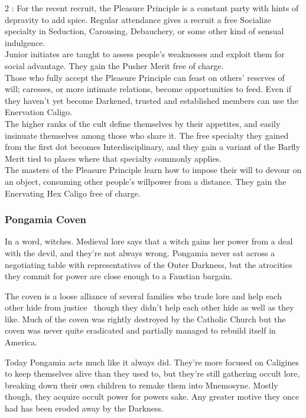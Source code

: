 \begin{multicols}{2}
\noindent \textbullet: For the recent recruit, the Pleasure Principle is a constant party with hints of depravity to add spice. Regular attendance gives a recruit a free Socialize specialty in Seduction, Carousing, Debauchery, or some other kind of sensual indulgence.\\
\noindent \textbullet\textbullet Junior initiates are taught to assess people’s weaknesses and exploit them for social advantage. They gain the Pusher Merit free of charge.\\
\noindent \textbullet\textbullet\textbullet Those who fully accept the Pleasure Principle can feast on others’ reserves of will; caresses, or more intimate relations, become opportunities to feed. Even if they haven’t yet become Darkened, trusted and established members can use the Enervation Caligo.\\
\noindent \textbullet\textbullet\textbullet\textbullet The higher ranks of the cult define themselves by their appetites, and easily insinuate themselves among those who share it. The free specialty they gained from the first dot becomes Interdisciplinary, and they gain a variant of the Barfly Merit tied to places where that specialty commonly applies.\\
\noindent \textbullet\textbullet\textbullet\textbullet\textbullet The masters of the Pleasure Principle learn how to impose their will to devour on an object, consuming other people’s willpower from a distance. They gain the Enervating Hex Caligo free of charge.

\subsubsection*{Pongamia Coven}

In a word, witches. Medieval lore says that a witch gains her power from a deal with the devil, and they're not always wrong. Pongamia never sat across a negotiating table with representatives of the Outer Darkness, but the atrocities they commit for power are close enough to a Faustian bargain. 

The coven is a loose alliance of several families who trade lore and help each other hide from justice \textemdash\, though they didn't help each other hide as well as they like. Much of the coven was rightly destroyed by the Catholic Church but the coven was never quite eradicated and partially managed to rebuild itself in America. 

Today Pongamia acts much like it always did. They're more focused on Caligines to keep themselves alive than they used to, but they're still gathering occult lore, breaking down their own children to remake them into Mnemosyne. Mostly though, they acquire occult power for powers sake. Any greater motive they once had has been eroded away by the Darkness. 


\end{multicols}
